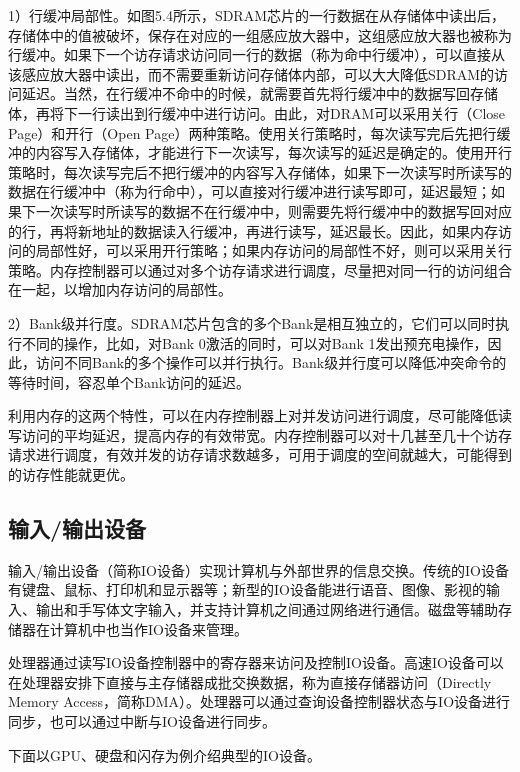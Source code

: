 \documentclass[]{ctexbook}
\begin{document}
1）行缓冲局部性。如图5.4所示，SDRAM芯片的一行数据在从存储体中读出后，存储体中的值被破坏，保存在对应的一组感应放大器中，这组感应放大器也被称为行缓冲。如果下一个访存请求访问同一行的数据（称为命中行缓冲），可以直接从该感应放大器中读出，而不需要重新访问存储体内部，可以大大降低SDRAM的访问延迟。当然，在行缓冲不命中的时候，就需要首先将行缓冲中的数据写回存储体，再将下一行读出到行缓冲中进行访问。由此，对DRAM可以采用关行（Close Page）和开行（Open Page）两种策略。使用关行策略时，每次读写完后先把行缓冲的内容写入存储体，才能进行下一次读写，每次读写的延迟是确定的。使用开行策略时，每次读写完后不把行缓冲的内容写入存储体，如果下一次读写时所读写的数据在行缓冲中（称为行命中），可以直接对行缓冲进行读写即可，延迟最短；如果下一次读写时所读写的数据不在行缓冲中，则需要先将行缓冲中的数据写回对应的行，再将新地址的数据读入行缓冲，再进行读写，延迟最长。因此，如果内存访问的局部性好，可以采用开行策略；如果内存访问的局部性不好，则可以采用关行策略。内存控制器可以通过对多个访存请求进行调度，尽量把对同一行的访问组合在一起，以增加内存访问的局部性。

2）Bank级并行度。SDRAM芯片包含的多个Bank是相互独立的，它们可以同时执行不同的操作，比如，对Bank 0激活的同时，可以对Bank 1发出预充电操作，因此，访问不同Bank的多个操作可以并行执行。Bank级并行度可以降低冲突命令的等待时间，容忍单个Bank访问的延迟。

利用内存的这两个特性，可以在内存控制器上对并发访问进行调度，尽可能降低读写访问的平均延迟，提高内存的有效带宽。内存控制器可以对十几甚至几十个访存请求进行调度，有效并发的访存请求数越多，可用于调度的空间就越大，可能得到的访存性能就更优。

\hypertarget{ux8f93ux5165ux8f93ux51faux8bbeux5907}{%
\subsection{输入/输出设备}\label{ux8f93ux5165ux8f93ux51faux8bbeux5907}}

输入/输出设备（简称IO设备）实现计算机与外部世界的信息交换。传统的IO设备有键盘、鼠标、打印机和显示器等；新型的IO设备能进行语音、图像、影视的输入、输出和手写体文字输入，并支持计算机之间通过网络进行通信。磁盘等辅助存储器在计算机中也当作IO设备来管理。

处理器通过读写IO设备控制器中的寄存器来访问及控制IO设备。高速IO设备可以在处理器安排下直接与主存储器成批交换数据，称为直接存储器访问（Directly Memory Access，简称DMA）。处理器可以通过查询设备控制器状态与IO设备进行同步，也可以通过中断与IO设备进行同步。

下面以GPU、硬盘和闪存为例介绍典型的IO设备。
\end{document}
